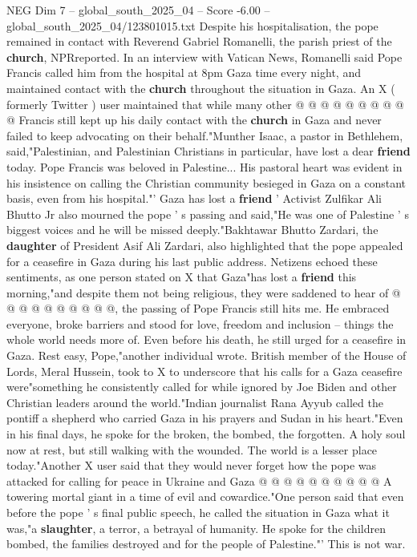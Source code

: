 \begin{textsample}{NEG Dim 7 – global\_south\_2025\_04 – Score -6.00 – global\_south\_2025\_04/123801015.txt}
Despite his hospitalisation, the pope remained in contact with Reverend Gabriel Romanelli, the parish priest of the \textbf{church}, NPRreported.
In an interview with Vatican News, Romanelli said Pope Francis called him from the hospital at 8pm Gaza time every night, and maintained contact with the \textbf{church} throughout the situation in Gaza.
An X ( formerly Twitter ) user maintained that while many other @ @ @ @ @ @ @ @ @ @ Francis still kept up his daily contact with the \textbf{church} in Gaza and never failed to keep advocating on their behalf."Munther Isaac, a pastor in Bethlehem, said,"Palestinian, and Palestinian Christians in particular, have lost a dear \textbf{friend} today.
Pope Francis was beloved in Palestine...
His pastoral heart was evident in his insistence on calling the Christian community besieged in Gaza on a constant basis, even from his hospital."' Gaza has lost a \textbf{friend} ' Activist Zulfikar Ali Bhutto Jr also mourned the pope ' s passing and said,"He was one of Palestine ' s biggest voices and he will be missed deeply."Bakhtawar Bhutto Zardari, the \textbf{daughter} of President Asif Ali Zardari, also highlighted that the pope appealed for a ceasefire in Gaza during his last public address.
Netizens echoed these sentiments, as one person stated on X that Gaza"has lost a \textbf{friend} this morning,"and despite them not being religious, they were saddened to hear of @ @ @ @ @ @ @ @ @ @, the passing of Pope Francis still hits me.
He embraced everyone, broke barriers and stood for love, freedom and inclusion -- things the whole world needs more of.
Even before his death, he still urged for a ceasefire in Gaza.
Rest easy, Pope,"another individual wrote.
British member of the House of Lords, Meral Hussein, took to X to underscore that his calls for a Gaza ceasefire were"something he consistently called for while ignored by Joe Biden and other Christian leaders around the world."Indian journalist Rana Ayyub called the pontiff a shepherd who carried Gaza in his prayers and Sudan in his heart."Even in his final days, he spoke for the broken, the bombed, the forgotten.
A holy soul now at rest, but still walking with the wounded.
The world is a lesser place today."Another X user said that they would never forget how the pope was attacked for calling for peace in Ukraine and Gaza @ @ @ @ @ @ @ @ @ @ A towering mortal giant in a time of evil and cowardice."One person said that even before the pope ' s final public speech, he called the situation in Gaza what it was,"a \textbf{slaughter}, a terror, a betrayal of humanity.
He spoke for the children bombed, the families destroyed and for the people of Palestine."' This is not war.

\end{textsample}
